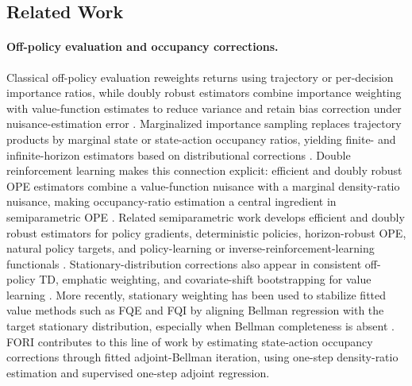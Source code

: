 \documentclass{article}
\newcommand{\1}{\mathbf{1}}
\theoremstyle{plain}
\theoremstyle{definition}
\theoremstyle{remark}
\begin{document}
\subsection{Related Work}

\paragraph{Off-policy evaluation and occupancy corrections.}
Classical off-policy evaluation reweights returns using trajectory or
per-decision importance ratios, while doubly robust estimators combine
importance weighting with value-function estimates to reduce variance and retain
bias correction under nuisance-estimation error
\citep{thomasBrunskill2016DataEfficientOPE,jiangLi2016DoublyRobust}.
Marginalized importance sampling replaces trajectory products by marginal state
or state-action occupancy ratios, yielding finite- and infinite-horizon
estimators based on distributional corrections
\citep{xieEtAl2019MarginalizedIS,yinWang2020EfficientTabularOPE,
liuEtAl2018InfiniteHorizonOPE}. Double reinforcement learning makes this
connection explicit: efficient and doubly robust OPE estimators combine a
value-function nuisance with a marginal density-ratio nuisance, making
occupancy-ratio estimation a central ingredient in semiparametric OPE
\citep{kallusUehara2019IntrinsicOPE,kallusUehara2020DRL_ICML,
kallusUehara2020DoubleRL,ueharaShiKallus2022OPEReview}. Related
semiparametric work develops efficient and doubly robust estimators for policy
gradients, deterministic policies, horizon-robust OPE, natural policy targets,
and policy-learning or inverse-reinforcement-learning functionals
\citep{kallusUehara2020PolicyGradients,kallusUehara2020DeterministicPolicyDR,
kallusUehara2022BreakingHorizonDRL,kallusUehara2024NaturalPolicies,
vanDerLaanEtAl2025AutomaticDRL,vanDerLaanKallusBibaut2025ClassificationIRL,
vanDerLaanBibautKallus2025EfficientIRL}. Stationary-distribution corrections also appear in consistent off-policy TD,
emphatic weighting, and covariate-shift bootstrapping for value learning
\citep{hallakMannor2017COPTD,suttonEtAl2016EmphaticTD,
geladaBellemare2019CovariateShift,pattersonEtAl2022GeneralizedPBE}. More
recently, stationary weighting has been used to stabilize fitted value methods
such as FQE and FQI by aligning Bellman regression with the target stationary
distribution, especially when Bellman completeness is absent
\citep{vanDerLaanKallus2025StationaryWeightedFQE,vanDerLaanKallus2025SoftFQI}. \textsc{FORI}
contributes to this line of work by estimating state-action occupancy
corrections through fitted adjoint-Bellman iteration, using one-step
density-ratio estimation and supervised one-step adjoint regression.
\end{document}
